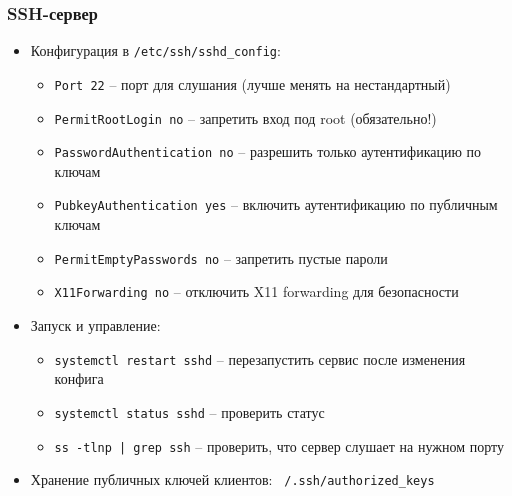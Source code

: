 \documentclass{beamer}
\begin{document}
\begin{frame}
\frametitle{SSH-сервер}

\begin{itemize}
  \item Конфигурация в \texttt{/etc/ssh/sshd\_config}:
  \begin{itemize}
    \item \texttt{Port 22} – порт для слушания (лучше менять на нестандартный)
    \item \texttt{PermitRootLogin no} – запретить вход под root (обязательно!)
    \item \texttt{PasswordAuthentication no} – разрешить только аутентификацию по ключам
    \item \texttt{PubkeyAuthentication yes} – включить аутентификацию по публичным ключам
    \item \texttt{PermitEmptyPasswords no} – запретить пустые пароли
    \item \texttt{X11Forwarding no} – отключить X11 forwarding для безопасности
  \end{itemize}
  \item Запуск и управление:
  \begin{itemize}
    \item \texttt{systemctl restart sshd} – перезапустить сервис после изменения конфига
    \item \texttt{systemctl status sshd} – проверить статус
    \item \texttt{ss -tlnp | grep ssh} – проверить, что сервер слушает на нужном порту
  \end{itemize}
  \item Хранение публичных ключей клиентов: \texttt{~/.ssh/authorized\_keys}
\end{itemize}

\end{frame}
\end{document}
